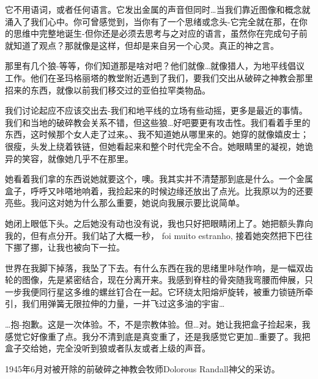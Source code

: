 \begin{scpbox}


它不用语词，或者任何语言。它发出金属的声音但同时…当我们靠近图像和概念就涌入了我们心中。你可曾感觉到，当你有了一个思绪或念头-它完全就在那，在你的思维中完整地诞生-但你还是必须去思考与之对应的语言，虽然你在完成句子前就知道了观点？那就像是这样，但却是来自另一个心灵。真正的神之言。

\end{scpbox}

\begin{scpbox}


那里有几个狼-等等，你们知道那是啥对吧？他们就像…就像猎人，为地平线倡议工作。他们在圣玛格丽塔的教堂附近遇到了我们，要我们交出从破碎之神教会那里招来的东西，就像以前我们移交过的亚伯拉罕类物品。

我们讨论起应不应该交出去-我们和地平线的立场有些动摇，更多是最近的事情。我们和当地的破碎教会关系不错，但这些狼…好吧要更有攻击性。我们看着手里的东西，这时候那个女人走了过来。、我不知道她从哪里来的。她穿的就像嬉皮士；很瘦，头发上绕着铁链，但她看起来和整个时代完全不合。她眼睛里的凝视，她诡异的笑容，就像她几乎不在那里。

她看着我们拿的东西说她就要这个，噢。我其实并不清楚那到底是什么。一个金属盒子，呼呼又咔嗒地响着，我捡起来的时候边缘还放出了点光。比我原以为的还要亮些。我问这对她为什么那么重要，她说向我展示要比说简单。

她闭上眼低下头。之后她没有动也没有说，我也只好把眼睛闭上了。她把额头靠向我的，但有点分开。我们站了大概一秒， foi muito estranho, 接着她突然把下巴往下挪了挪，让我也被向下一拉。

世界在我脚下掉落，我坠了下去。有什么东西在我的思绪里咔哒作响，是一幅双齿轮的图像，先是紧密结合，现在分离开来。我感到脊柱的骨突随我弯腰而伸展，只一步我便同行星这多维的螺丝钉合在一起。它环绕太阳熔炉旋转，被重力锁链所牵引，我们用弹簧无限拉伸的力量，一并飞过这多油的宇宙…

…抱-抱歉。这是一次体验。不，不是宗教体验。但…对。她让我把盒子捡起来，我感觉它好像重了点。我分不清到底是真变重了，还是我感觉它更加…重要了。我把盒子交给她，完全没听到狼或者队友或者上级的声音。

\end{scpbox}

1945年6月对被开除的前破碎之神教会牧师Dolorous Randall神父的采访。

